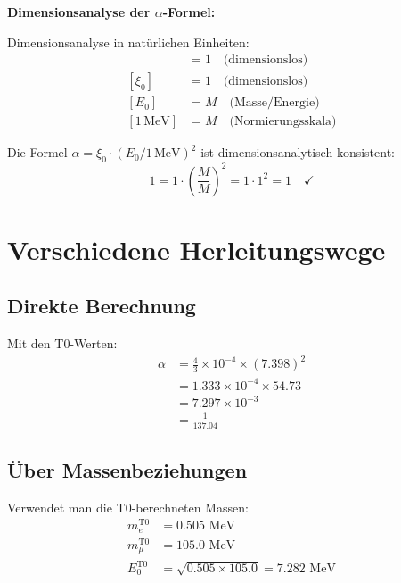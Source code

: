\documentclass[12pt,a4paper]{article}
\newcommand{\xipar}{\xi_0}
\newcommand{\Ezero}{E_0}
\begin{document}
	\begin{foundation}
		\textbf{Dimensionsanalyse der $\alpha$-Formel:}
		
		Dimensionsanalyse in natürlichen Einheiten:
		\begin{align}
			[\alpha] &= 1 \quad \text{(dimensionslos)}\\
			[\xipar] &= 1 \quad \text{(dimensionslos)}\\
			[\Ezero] &= M \quad \text{(Masse/Energie)}\\
			[1\,\text{MeV}] &= M \quad \text{(Normierungsskala)}
		\end{align}
		
		Die Formel $\alpha = \xipar \cdot (\Ezero/1\,\text{MeV})^2$ ist dimensionsanalytisch konsistent:
		\begin{equation}
			1 = 1 \cdot \left(\frac{M}{M}\right)^2 = 1 \cdot 1^2 = 1 \quad \checkmark
		\end{equation}
	\end{foundation}
	
	\section{Verschiedene Herleitungswege}
	
	\subsection{Direkte Berechnung}
	
	Mit den T0-Werten:
	\begin{align}
		\alpha &= \frac{4}{3} \times 10^{-4} \times (7.398)^2\\
		&= 1.333 \times 10^{-4} \times 54.73\\
		&= 7.297 \times 10^{-3}\\
		&= \frac{1}{137.04}
	\end{align}
	
	\subsection{Über Massenbeziehungen}
	
	Verwendet man die T0-berechneten Massen:
	\begin{align}
		m_e^{\text{T0}} &= 0.505 \text{ MeV}\\
		m_\mu^{\text{T0}} &= 105.0 \text{ MeV}\\
		\Ezero^{\text{T0}} &= \sqrt{0.505 \times 105.0} = 7.282 \text{ MeV}
	\end{align}
	
\end{document}

